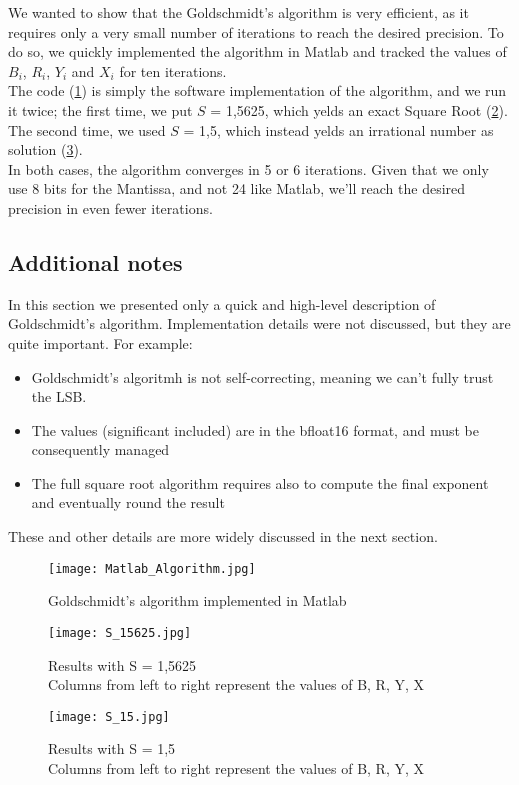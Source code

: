 We wanted to show that the Goldschmidt's algorithm is very efficient, as it requires only a very small number of iterations to reach the desired precision. To do so, we quickly implemented the algorithm in Matlab and tracked the values of $B_i$, $R_i$, $Y_i$ and $X_i$ for ten iterations.\\ The code (\ref{fig:Matlab_Algorithm}) is simply the software implementation of the algorithm, and we run it twice; the first time, we put $S$ = 1,5625, which yelds an exact Square Root (\ref{fig:S_15625}).  The second time, we used $S$ = 1,5, which instead yelds an irrational number as solution (\ref{fig:S_15}).\\
In both cases, the algorithm converges in 5 or 6 iterations. Given that we only use 8 bits for the Mantissa, and not 24 like Matlab, we'll reach the desired precision in even fewer iterations.

\subsection{Additional notes}
In this section we presented only a quick and high-level description of Goldschmidt's algorithm. Implementation details were not discussed, but they are quite important. For example:
\begin{itemize}
\item Goldschmidt's algoritmh is not self-correcting, meaning we can't fully trust the LSB.
\item The values (significant included) are in the bfloat16 format, and must be consequently managed
\item The full square root algorithm requires also to compute the final exponent and eventually round the result
\end{itemize}
These and other details are more widely discussed in the next section.
\begin{figure}[h]
	\centering
	\captionsetup{justification=centering}
	\texttt{[image: Matlab\_Algorithm.jpg]}	
	\caption{Goldschmidt's algorithm implemented in Matlab}
	\label {fig:Matlab_Algorithm}
\end{figure}

\begin{figure}[h]
	\centering
	\captionsetup{justification=centering}
	\texttt{[image: S\_15625.jpg]}	
	\caption{Results with S = 1,5625\\Columns from left to right represent the values of B, R, Y, X}
	\label {fig:S_15625}
\end{figure}


\begin{figure}[h]
	\centering
	\captionsetup{justification=centering}
	\texttt{[image: S\_15.jpg]}	
	\caption{Results with S = 1,5\\Columns from left to right represent the values of B, R, Y, X}
	\label {fig:S_15}
\end{figure}

\clearpage
